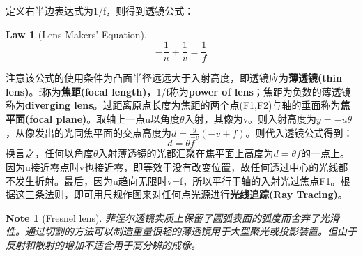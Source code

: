 \documentclass[12pt]{ctexart}%
\newtheorem{theorem}{Law}
\newtheorem{note}{Note}
\begin{document}
定义右半边表达式为1/f，则得到透镜公式：
\begin{theorem}[Lens Makers' Equation]\label{lens}
    \[-\frac{1}{u}+\frac{1}{v}=\frac{1}{f}\]
\end{theorem}
\par 注意该公式的使用条件为凸面半径远远大于入射高度，即透镜应为\textbf{薄透镜(thin lens)}。f称为\textbf{焦距(focal length)}，1/f称为\textbf{power of lens}；焦距为负数的薄透镜称为\textbf{diverging lens}。过距离原点长度为焦距的两个点(F1,F2)与轴的垂面称为\textbf{焦平面(focal plane)}。取轴上一点u以角度$\theta$入射，其像为v。则入射高度为$y=-u\theta$，从像发出的光同焦平面的交点高度为$d=\frac{y}{-v}(-v+f)$。则代入透镜公式得到：
\begin{equation}
    d=\theta f
\end{equation}
换言之，任何以角度$\theta$入射薄透镜的光都汇聚在焦平面上高度为$d=\theta f$的一点上。因为u接近零点时v也接近零，即等效于没有改变位置，故任何透过中心的光线都不发生折射。最后，因为u趋向无限时v=f，所以平行于轴的入射光过焦点F1。根据这三条法则，即可用尺规作图来对任何点光源进行\textbf{光线追踪(Ray Tracing)}。
\begin{note}[Fresnel lens]
    菲涅尔透镜实质上保留了圆弧表面的弧度而舍弃了光滑性。通过切割的方法可以制造重量很轻的薄透镜用于大型聚光或投影装置。但由于反射和散射的增加不适合用于高分辨的成像。
\end{note}
\end{document}
